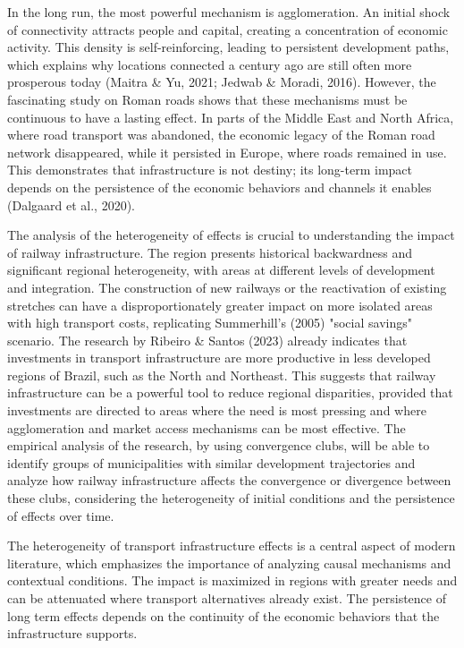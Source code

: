 \documentclass[12pt, a4paper]{article}
\begin{document}
In the long run, the most powerful mechanism is agglomeration. An initial shock of connectivity attracts people and capital, creating a concentration of economic activity. This density is self-reinforcing, leading to persistent development paths, which explains why locations connected a century ago are still often more prosperous today (Maitra \& Yu, 2021; Jedwab \& Moradi, 2016). However, the fascinating study on Roman roads shows that these mechanisms must be continuous to have a lasting effect. In parts of the Middle East and North Africa, where road transport was abandoned, the economic legacy of the Roman road network disappeared, while it persisted in Europe, where roads remained in use. This demonstrates that infrastructure is not destiny; its long-term impact depends on the persistence of the economic behaviors and channels it enables (Dalgaard et al., 2020). 

The analysis of the heterogeneity of effects is crucial to understanding the impact of railway infrastructure. The region presents historical backwardness and significant regional heterogeneity, with areas at different levels of development and integration. The construction of new railways or the reactivation of existing stretches can have a disproportionately greater impact on more isolated areas with high transport costs, replicating Summerhill's (2005) "social savings" scenario. The research by Ribeiro \& Santos (2023) already indicates that investments in transport infrastructure are more productive in less developed regions of Brazil, such as the North and Northeast. This suggests that railway infrastructure can be a powerful tool to reduce regional disparities, provided that investments are directed to areas where the need is most pressing and where agglomeration and market access mechanisms can be most effective. The empirical analysis of the research, by using convergence clubs, will be able to identify groups of municipalities with similar development trajectories and analyze how railway infrastructure affects the convergence or divergence between these clubs, considering the heterogeneity of initial conditions and the persistence of effects over time. 

The heterogeneity of transport infrastructure effects is a central aspect of modern literature, which emphasizes the importance of analyzing causal mechanisms and contextual conditions. The impact is maximized in regions with greater needs and can be attenuated where transport alternatives already exist. The persistence of long term effects depends on the continuity of the economic behaviors that the infrastructure supports. 
\end{document}
